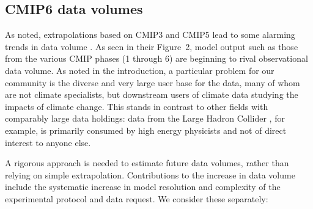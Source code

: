 \documentclass[gmd,manuscript]{copernicus}
\begin{document}
\subsection{CMIP6 data volumes}
\label{sec:dvol}

As noted, extrapolations based on CMIP3 and CMIP5 lead to some
alarming trends in data volume \citep[see
e.g.,][]{ref:overpecketal2011}.
As seen in their Figure~2, model output such as those from the various
CMIP phases (1 through 6) are
beginning to rival observational data volume. As noted in the
introduction, a particular problem for our community is the diverse
and very large user base for the data, many of whom are not climate
specialists, but downstream users of climate data studying the impacts
of climate change. This stands in contrast to other fields with
comparably large data holdings: data from the Large Hadron Collider
\citep[e.g.,][]{ref:aadetal2008}, for example, is primarily consumed by
high energy physicists and not of direct interest to anyone else.

A rigorous approach is needed to estimate future
data volumes, rather than relying on simple extrapolation. Contributions to
the increase in data volume include the systematic increase in model
resolution and complexity of the experimental protocol and data
request. We consider these separately:
\end{document}
